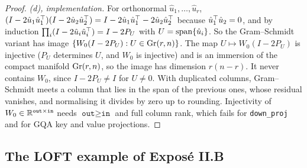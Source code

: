 \begin{proof}
\emph{(d), implementation.} For orthonormal $\hat u_1,\dots,\hat u_r$,
$(I-2\hat u_1\hat u_1^{\top})(I-2\hat u_2\hat u_2^{\top})=I-2\hat u_1\hat u_1^{\top}-2\hat u_2\hat u_2^{\top}$ because $\hat u_1^{\top}\hat u_2=0$, and
by induction $\prod_i(I-2\hat u_i\hat u_i^{\top})=I-2P_U$ with $U=\operatorname{span}\{\hat u_i\}$. So the Gram--Schmidt variant has image
$\{W_0(I-2P_U):U\in\operatorname{Gr}(r,n)\}$. The map $U\mapsto W_0(I-2P_U)$ is injective ($P_U$ determines $U$, and $W_0$ is injective) and
is an immersion of the compact manifold $\operatorname{Gr}(r,n)$, so the image has dimension $r(n-r)$. It never contains $W_0$, since
$I-2P_U\ne I$ for $U\ne0$. With duplicated columns, Gram--Schmidt meets a column that lies in the span of the previous
ones, whose residual vanishes, and normalising it divides by zero up to rounding. Injectivity of
$W_0\in\mathbb{R}^{\texttt{out}\times\texttt{in}}$ needs $\texttt{out}\ge\texttt{in}$ and full column rank, which fails for
\texttt{down\_proj} and for GQA key and value projections.
\end{proof}

\subsection{The LOFT example of Exposé II.B}\label{proof:loft}

